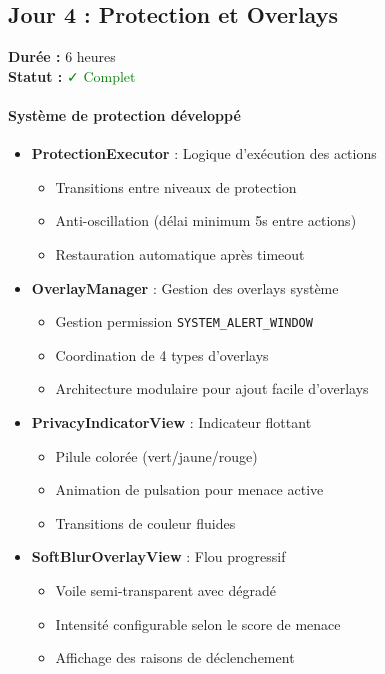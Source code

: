 \documentclass[11pt,a4paper]{article}
\begin{document}
\subsection{Jour 4 : Protection et Overlays}

\textbf{Durée :} 6 heures \\
\textbf{Statut :} \textcolor{green}{✓ Complet}

\paragraph{Système de protection développé}
\begin{itemize}
    \item \textbf{ProtectionExecutor} : Logique d'exécution des actions
    \begin{itemize}
        \item Transitions entre niveaux de protection
        \item Anti-oscillation (délai minimum 5s entre actions)
        \item Restauration automatique après timeout
    \end{itemize}
    \item \textbf{OverlayManager} : Gestion des overlays système
    \begin{itemize}
        \item Gestion permission \texttt{SYSTEM\_ALERT\_WINDOW}
        \item Coordination de 4 types d'overlays
        \item Architecture modulaire pour ajout facile d'overlays
    \end{itemize}
    \item \textbf{PrivacyIndicatorView} : Indicateur flottant
    \begin{itemize}
        \item Pilule colorée (vert/jaune/rouge)
        \item Animation de pulsation pour menace active
        \item Transitions de couleur fluides
    \end{itemize}
    \item \textbf{SoftBlurOverlayView} : Flou progressif
    \begin{itemize}
        \item Voile semi-transparent avec dégradé
        \item Intensité configurable selon le score de menace
        \item Affichage des raisons de déclenchement

\end{itemize}
\end{itemize}
\end{document}

